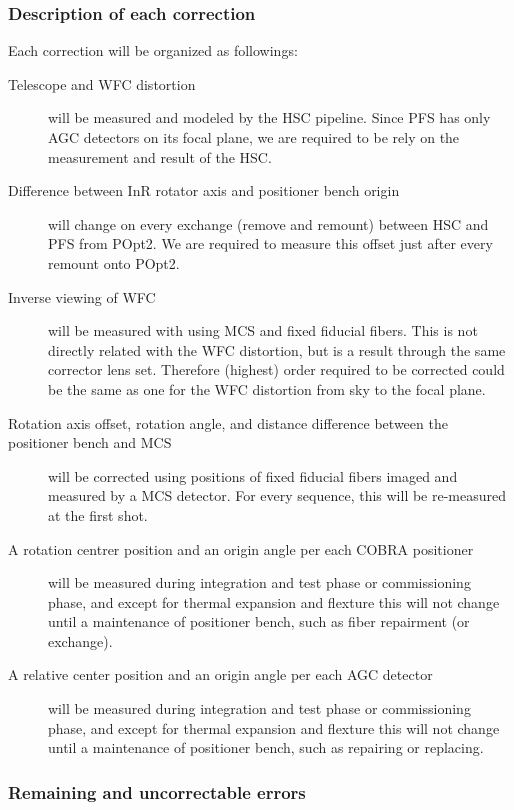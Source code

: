 \documentclass[a4paper,notitlepage]{article}
\begin{document}
\subsubsection{Description of each correction}

Each correction will be organized as followings: 

\begin{description}
  \item[Telescope and WFC distortion] 
    will be measured and modeled by the HSC pipeline. 
    Since PFS has only AGC detectors on its focal plane, we are required to be 
    rely on the measurement and result of the HSC. 
  \item[Difference between InR rotator axis and positioner bench origin]
    will change on every exchange (remove and remount) between HSC and PFS 
    from POpt2. We are required to measure this offset just after every 
    remount onto POpt2. 
  \item[Inverse viewing of WFC]
    will be measured with using MCS and fixed fiducial fibers. This is not 
    directly related with the WFC distortion, but is a result through the same 
    corrector lens set. Therefore (highest) order required to be corrected 
    could be the same as one for the WFC distortion from sky to the focal 
    plane. 
  \item[Rotation axis offset, rotation angle, 
    and distance difference between 
    the positioner bench and MCS] 
    will be corrected using positions of fixed fiducial fibers imaged and 
    measured by a MCS detector. For every sequence, this will be re-measured 
    at the first shot. 
  \item[A rotation centrer position and an origin 
    angle per each COBRA positioner]
    will be measured during integration and test phase or commissioning phase, 
    and except for thermal expansion and flexture 
    this will not change until a maintenance of positioner bench, such as 
    fiber repairment (or exchange). 
  \item[A relative center position and an origin 
    angle per each AGC detector] 
    will be measured during integration and test phase or commissioning phase, 
    and except for thermal expansion and flexture 
    this will not change until a maintenance of positioner bench, such as 
    repairing or replacing. 
\end{description}

\subsubsection{Remaining and uncorrectable errors}
\end{document}
